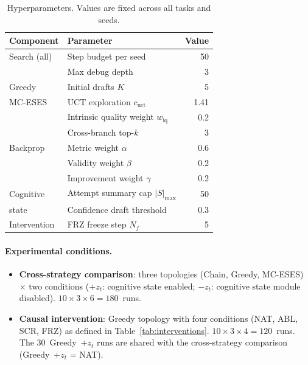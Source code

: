 \documentclass{article} %
\newcommand{\zt}{z_t}
\begin{document}
\begin{table}[h]
\centering
\caption{Hyperparameters. Values are fixed across all tasks and seeds.}
\label{tab:hyperparams}
\footnotesize
\begin{tabular}{@{}llr@{}}
\toprule
\textbf{Component} & \textbf{Parameter} & \textbf{Value} \\
\midrule
Search (all)  & Step budget per seed      & 50 \\
              & Max debug depth            & 3 \\
Greedy        & Initial drafts $K$         & 5 \\
MC-ESES       & UCT exploration $c_{\text{uct}}$ & 1.41 \\
              & Intrinsic quality weight $w_{\text{iq}}$ & 0.2 \\
              & Cross-branch top-$k$       & 3 \\
Backprop      & Metric weight $\alpha$     & 0.6 \\
              & Validity weight $\beta$    & 0.2 \\
              & Improvement weight $\gamma$& 0.2 \\
Cognitive     & Attempt summary cap $|S|_{\max}$ & 50 \\
state         & Confidence draft threshold & 0.3 \\
Intervention  & FRZ freeze step $N_f$      & 5 \\
\bottomrule
\end{tabular}
\end{table}

\paragraph{Experimental conditions.}
\begin{itemize}
  \item \textbf{Cross-strategy comparison}: three topologies
  (Chain, Greedy, MC-ESES) $\times$ two conditions ($+\zt$: cognitive state
  enabled; $-\zt$: cognitive state module disabled).
  $10 \times 3 \times 6 = 180$~runs.
  \item \textbf{Causal intervention}: Greedy topology with four conditions
  (NAT, ABL, SCR, FRZ) as defined in Table~\ref{tab:interventions}.
  $10 \times 3 \times 4 = 120$~runs. The 30~Greedy~$+\zt$ runs are shared
  with the cross-strategy comparison (Greedy~$+\zt$ = NAT).
\end{itemize}
\end{document}
